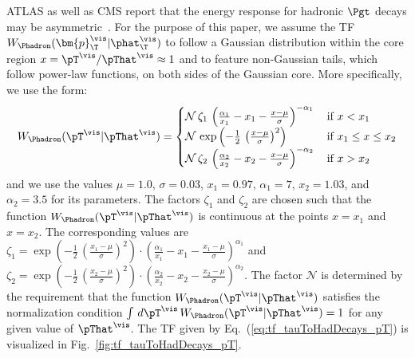 ATLAS as well as CMS report that the energy response for hadronic
$\Pgt$ decays may be asymmetric~\cite{ATLAS:2011tfa,PRF-14-001}.
For the purpose of this paper, we assume the TF $W_{\Phadron}( \bm{p}_{\T}^{\vis} | \phat_{\T}^{\vis} )$ 
to follow a Gaussian distribution within the core region $x = \pT^{\vis}/\pThat^{\vis} \approx 1$ and to feature non-Gaussian tails,
which follow power-law functions, on both sides of the Gaussian core.
More specifically, we use the form:
\begin{equation}
W_{\Phadron}( \pT^{\vis} | \pThat^{\vis} ) = 
 \begin{cases}
   \mathcal{N} \, \zeta_{1} \, \left( \frac{\alpha_{1}}{x_{1}} - x_{1} - \frac{x - \mu}{\sigma} \right)^{-\alpha_{1}} \,  
 & \mbox{if } x < x_{1} \\
   \mathcal{N} \, \exp\left( -\frac{1}{2} \, \left( \frac{x - \mu}{\sigma} \right)^{2} \right) \,
 & \mbox{if } x_{1} \leq x \leq x_{2} \\
   \mathcal{N} \, \zeta_{2} \, \left( \frac{\alpha_{2}}{x_{2}} - x_{2} - \frac{x - \mu}{\sigma} \right)^{-\alpha_{2}} \,
 & \mbox{if } x > x_{2} 
 \end{cases}
\label{eq:tf_tauToHadDecays_pT}
\end{equation}
and we use the values $\mu = 1.0$, $\sigma = 0.03$, $x_{1} = 0.97$, $\alpha_{1} = 7$,
$x_{2} = 1.03$, and $\alpha_{2} = 3.5$ for its parameters.
The factors $\zeta_{1}$ and $\zeta_{2}$ are chosen such that the
function $W_{\Phadron}( \pT^{\vis} | \pThat^{\vis} )$ is continuous at
the points $x = x_{1}$ and $x = x_{2}$. 
The corresponding values are 
$\zeta_{1} = \exp\left( -\frac{1}{2} \, \left( \frac{x_{1} - \mu}{\sigma} \right)^{2} \right) \cdot \left( \frac{\alpha_{1}}{x_{1}} - x_{1} - \frac{x_{1} - \mu}{\sigma} \right)^{\alpha_{1}}$
and
$\zeta_{2} = \exp\left( -\frac{1}{2} \, \left( \frac{x_{2} - \mu}{\sigma} \right)^{2} \right) \cdot \left( \frac{\alpha_{2}}{x_{2}} - x_{2} - \frac{x_{2} - \mu}{\sigma} \right)^{\alpha_{2}}$.
The factor $\mathcal{N}$ is determined by the requirement that the function $W_{\Phadron}( \pT^{\vis} | \pThat^{\vis} )$ 
satisfies the normalization condition $\int \, d\pT^{\vis} \, W_{\Phadron}( \pT^{\vis} | \pThat^{\vis} ) = 1$ for any given value of $\pThat^{\vis}$.
The TF given by Eq.~(\ref{eq:tf_tauToHadDecays_pT}) is visualized in Fig.~\ref{fig:tf_tauToHadDecays_pT}.

